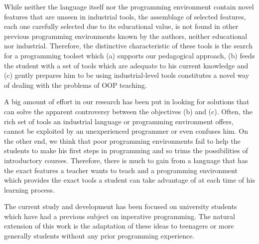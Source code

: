 While neither the language itself nor the programming environment contain novel features that are unseen in industrial tools,
the assemblage of selected features, each one carefully selected due to its educational value,
is not found in other previous programming environments known by the authors, neither educational nor industrial.
Therefore, the distinctive characteristic of these tools is the search for a programming toolset which 
(a) supports our pedagogical approach,
(b) feeds the student with a set of tools which are adequate to his current knowledge
and (c) gently prepares him to be using industrial-level tools constitutes a novel way of dealing with the problems of OOP teaching.

A big amount of effort in our research has been put in looking for solutions that can solve the apparent controversy between the objectives (b) and (c).
Often, the rich set of tools an industrial language or programming environment offers, cannot be exploited by an unexperienced programmer or even confuses him.
On the other end, we think that poor programming environments fail to help the students to make his first steps in programming and so trims the possibilities of introductory courses.
Therefore, there is much to gain from a language that has the exact features a teacher wants to teach
and a programming environment which provides the exact tools a student can take advantage of at each time of his learning process.

The current study and development has been focused on university students which have had a previous subject on inperative programming.
The natural extension of this work is the adaptation of these ideas to teenagers or more generally students without any prior programming experience.
